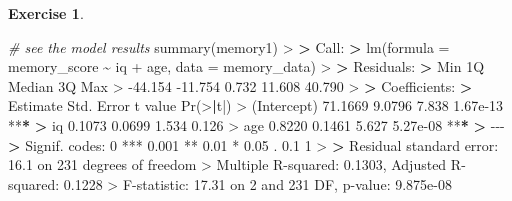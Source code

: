 \documentclass[
]{book}
\newenvironment{Shaded}{\begin{snugshade}}{\end{snugshade}}
\newcommand{\AttributeTok}[1]{\textcolor[rgb]{0.77,0.63,0.00}{#1}}
\newcommand{\CommentTok}[1]{\textcolor[rgb]{0.56,0.35,0.01}{\textit{#1}}}
\newcommand{\DecValTok}[1]{\textcolor[rgb]{0.00,0.00,0.81}{#1}}
\newcommand{\ErrorTok}[1]{\textcolor[rgb]{0.64,0.00,0.00}{\textbf{#1}}}
\newcommand{\FloatTok}[1]{\textcolor[rgb]{0.00,0.00,0.81}{#1}}
\newcommand{\FunctionTok}[1]{\textcolor[rgb]{0.00,0.00,0.00}{#1}}
\newcommand{\NormalTok}[1]{#1}
\newcommand{\SpecialCharTok}[1]{\textcolor[rgb]{0.00,0.00,0.00}{#1}}
\newcommand{\StringTok}[1]{\textcolor[rgb]{0.31,0.60,0.02}{#1}}
\theoremstyle{definition}
\theoremstyle{definition}
\theoremstyle{definition}
\newtheorem{exercise}{Exercise}[chapter]
\theoremstyle{definition}
\theoremstyle{remark}
\begin{document}
\begin{exercise}
\begin{Shaded}
\begin{Highlighting}[]
\CommentTok{\# see the model results}
\FunctionTok{summary}\NormalTok{(memory1)}
\SpecialCharTok{\textgreater{}} 
\ErrorTok{\textgreater{}}\NormalTok{ Call}\SpecialCharTok{:}
\ErrorTok{\textgreater{}} \FunctionTok{lm}\NormalTok{(}\AttributeTok{formula =}\NormalTok{ memory\_score }\SpecialCharTok{\textasciitilde{}}\NormalTok{ iq }\SpecialCharTok{+}\NormalTok{ age, }\AttributeTok{data =}\NormalTok{ memory\_data)}
\SpecialCharTok{\textgreater{}} 
\ErrorTok{\textgreater{}}\NormalTok{ Residuals}\SpecialCharTok{:}
\ErrorTok{\textgreater{}}\NormalTok{     Min      1Q  Median      3Q     Max }
\SpecialCharTok{\textgreater{}} \SpecialCharTok{{-}}\FloatTok{44.154} \SpecialCharTok{{-}}\FloatTok{11.754}   \FloatTok{0.732}  \FloatTok{11.608}  \FloatTok{40.790} 
\SpecialCharTok{\textgreater{}} 
\ErrorTok{\textgreater{}}\NormalTok{ Coefficients}\SpecialCharTok{:}
\ErrorTok{\textgreater{}}\NormalTok{             Estimate Std. Error t value }\FunctionTok{Pr}\NormalTok{(}\SpecialCharTok{\textgreater{}}\ErrorTok{|}\NormalTok{t}\SpecialCharTok{|}\NormalTok{)    }
\SpecialCharTok{\textgreater{}}\NormalTok{ (Intercept)  }\FloatTok{71.1669}     \FloatTok{9.0796}   \FloatTok{7.838} \FloatTok{1.67e{-}13} \SpecialCharTok{**}\ErrorTok{*}
\ErrorTok{\textgreater{}}\NormalTok{ iq            }\FloatTok{0.1073}     \FloatTok{0.0699}   \FloatTok{1.534}    \FloatTok{0.126}    
\SpecialCharTok{\textgreater{}}\NormalTok{ age           }\FloatTok{0.8220}     \FloatTok{0.1461}   \FloatTok{5.627} \FloatTok{5.27e{-}08} \SpecialCharTok{**}\ErrorTok{*}
\ErrorTok{\textgreater{}} \SpecialCharTok{{-}{-}{-}}
\ErrorTok{\textgreater{}}\NormalTok{ Signif. codes}\SpecialCharTok{:}  \DecValTok{0} \StringTok{\textquotesingle{}***\textquotesingle{}} \FloatTok{0.001} \StringTok{\textquotesingle{}**\textquotesingle{}} \FloatTok{0.01} \StringTok{\textquotesingle{}*\textquotesingle{}} \FloatTok{0.05} \StringTok{\textquotesingle{}.\textquotesingle{}} \FloatTok{0.1} \StringTok{\textquotesingle{} \textquotesingle{}} \DecValTok{1}
\SpecialCharTok{\textgreater{}} 
\ErrorTok{\textgreater{}}\NormalTok{ Residual standard error}\SpecialCharTok{:} \FloatTok{16.1}\NormalTok{ on }\DecValTok{231}\NormalTok{ degrees of freedom}
\SpecialCharTok{\textgreater{}}\NormalTok{ Multiple R}\SpecialCharTok{{-}}\NormalTok{squared}\SpecialCharTok{:}  \FloatTok{0.1303}\NormalTok{,  Adjusted R}\SpecialCharTok{{-}}\NormalTok{squared}\SpecialCharTok{:}  \FloatTok{0.1228} 
\SpecialCharTok{\textgreater{}}\NormalTok{ F}\SpecialCharTok{{-}}\NormalTok{statistic}\SpecialCharTok{:} \FloatTok{17.31}\NormalTok{ on }\DecValTok{2}\NormalTok{ and }\DecValTok{231}\NormalTok{ DF,  p}\SpecialCharTok{{-}}\NormalTok{value}\SpecialCharTok{:} \FloatTok{9.875e{-}08}
\end{Highlighting}
\end{Shaded}


\end{exercise}
\end{document}
